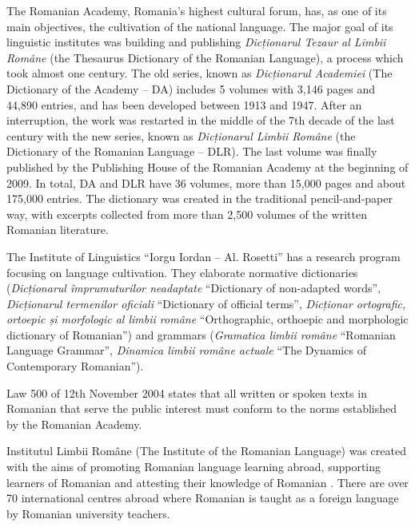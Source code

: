 \begin{multicols}{2}
The Romanian Academy, Romania’s highest cultural forum, has, as one of its main objectives, the cultivation of the national language. The major goal of its linguistic institutes was building and publishing \textit{Dicționarul Tezaur al Limbii Române} (the Thesaurus Dictionary of the Romanian Language), a process which took almost one century. The old series, known as \textit{Dicționarul Academiei} (The Dictionary of the Academy -- DA) includes 5 volumes with 3,146 pages and 44,890 entries, and has been developed between 1913 and 1947. After an interruption, the work was restarted in the middle of the 7th decade of the last century with the new series, known as \textit{Dicționarul Limbii Române} (the Dictionary of the Romanian Language -- DLR). The last volume was finally published by the Publishing House of the Romanian Academy at the beginning of 2009. In total, DA and DLR have 36 volumes, more than 15,000 pages and about 175,000 entries. The dictionary was created in the traditional pencil-and-paper way, with excerpts collected from more than 2,500 volumes of the written Romanian literature.

The Institute of Linguistics ``Iorgu Iordan -- Al. Rosetti'' has a research program focusing on language cultivation. They elaborate normative dictionaries (\textit{Dicționarul împrumuturilor neadaptate} ``Dictionary of non-adapted words'', \textit{Dicționarul termenilor oficiali} ``Dictionary of official terms'', \textit{Dicționar ortografic, ortoepic și morfologic al limbii române} ``Orthographic, orthoepic and morphologic dictionary of Romanian'') and grammars (\textit{Gramatica limbii române} ``Romanian Language Grammar'', \textit{Dinamica limbii române actuale} ``The Dynamics of Contemporary Romanian'').

Law 500 of 12th November 2004 states that all written or spoken texts in Romanian that serve the public interest must conform to the norms established by the Romanian Academy.


Institutul Limbii Române (The Institute of the Romanian Language) was created with the aims of promoting Romanian language learning abroad, supporting learners of Romanian and attesting their knowledge of Romanian \cite{urlILR}. There are over 70 international centres abroad where Romanian is taught as a foreign language by Romanian university teachers.


\end{multicols}
